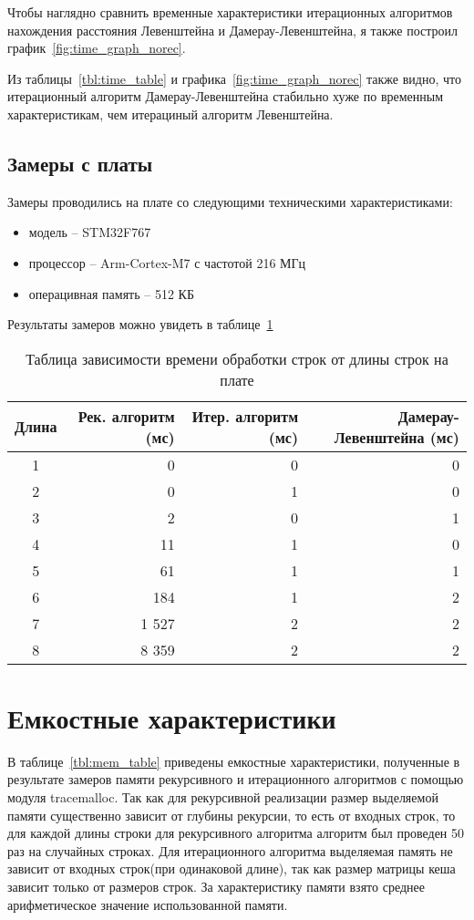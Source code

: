 Чтобы наглядно сравнить временные характеристики итерационных алгоритмов нахождения расстояния Левенштейна и Дамерау-Левенштейна, я также построил график~\ref{fig:time_graph_norec}.

Из таблицы~\ref{tbl:time_table} и графика~\ref{fig:time_graph_norec} также видно, что итерационный алгоритм Дамерау-Левенштейна стабильно хуже по временным характеристикам, чем итерациный алгоритм Левенштейна.

\subsection{Замеры с платы}

Замеры проводились на плате со следующими техническими характеристиками:
\begin{itemize}
	\item модель -- STM32F767
	\item процессор -- Arm-Cortex-M7 с частотой 216 МГц
	\item операцивная память -- 512 КБ
\end{itemize}

Результаты замеров можно увидеть в таблице~\ref{tbl:time_table_circuit}

\begin{longtable}[]{|c|r|r|r|}
\caption{Таблица зависимости времени обработки строк от длины строк на плате}
\label{tbl:time_table_circuit}
\\
\hline
Длина & Рек. алгоритм (мс) & Итер. алгоритм (мс) &  Дамерау-Левенштейна (мс) \\ \hline
1 & 0 		& 0 & 0 \\ \hline
2 & 0 		& 1 & 0 \\ \hline
3 & 2 		& 0 & 1 \\ \hline
4 & 11 		& 1 & 0 \\ \hline
5 & 61 		& 1 & 1 \\ \hline
6 & 184		& 1 & 2 \\ \hline
7 & 1 527 	& 2 & 2 \\ \hline
8 & 8 359 	& 2 & 2 \\ \hline
\end{longtable}

\section{Емкостные характеристики}

В таблице~\ref{tbl:mem_table} приведены емкостные характеристики, полученные в результате замеров памяти рекурсивного и итерационного алгоритмов с помощью модуля tracemalloc.
Так как для рекурсивной реализации размер выделяемой памяти существенно зависит от глубины рекурсии, то есть от входных строк, то для каждой длины строки для рекурсивного алгоритма алгоритм был проведен 50 раз на случайных строках. 
Для итерационного алгоритма выделяемая память не зависит от входных строк(при одинаковой длине), так как размер матрицы кеша зависит только от размеров строк. 
За характеристику памяти взято среднее арифметическое значение использованной памяти.

